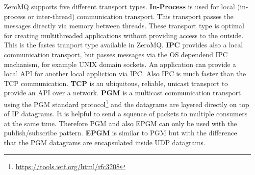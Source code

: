 ZeroMQ supports five different transport types.\newline
\textbf{In-Process} is used for local (in-process or inter-thread) communication transport.
This transport passes the messages directly via memory between threads.\autocite[cf.]{ZeroMQ:inproc}
These transport type is optimal for creating multithreaded applications without providing access to the outside.
This is the fastes tranport type available in ZeroMQ.\newline
\textbf{\ac{IPC}} provides also a local communication transport, but passes messages via the \ac{OS} dependend \ac{IPC} machanism, for example UNIX domain sockets.
An application can provide a local \ac{API} for another local appliction via \ac{IPC}.
Also \ac{IPC} is much faster than the \ac{TCP} communication.\newline
\textbf{\ac{TCP}} is an ubiquitous, reliable, unicast transport to provide an \ac{API} over a network.\autocite[cf.]{ZeroMQ:tcp}\newline
\textbf{\ac{PGM}} is a multicast communication transport using the \ac{PGM} standard protocol\footnote{\url{https://tools.ietf.org/html/rfc3208}} and the datagrams are layered directly on top of IP datagrams.\autocite[cf.]{ZeroMQ:pgm}
It is helpful to send a squence of packets to multiple consumers at the same time.
Therefore \ac{PGM} and also \acs{EPGM} can only be used with the publish/subscribe pattern.\newline
\textbf{\ac{EPGM}} is similar to \ac{PGM} but with the difference that the PGM datagrams are encapsulated inside UDP datagrams.\autocite[cf.]{ZeroMQ:pgm}

